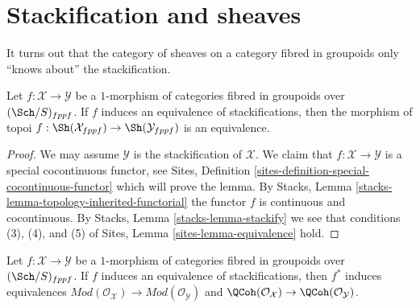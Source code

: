 \section{Stackification and sheaves}
\label{section-stackification}

\noindent
It turns out that the category of sheaves on a category fibred in
groupoids only ``knows about'' the stackification.

\begin{lemma}
\label{lemma-stackification}
Let $f : \mathcal{X} \to \mathcal{Y}$ be a $1$-morphism of categories
fibred in groupoids over $(\Sch/S)_{fppf}$. If
$f$ induces an equivalence of stackifications, then the morphism
of topoi
$f : \Sh(\mathcal{X}_{fppf}) \to \Sh(\mathcal{Y}_{fppf})$
is an equivalence.
\end{lemma}

\begin{proof}
We may assume $\mathcal{Y}$ is the stackification of $\mathcal{X}$.
We claim that $f : \mathcal{X} \to \mathcal{Y}$ is a special cocontinuous
functor, see
Sites, Definition \ref{sites-definition-special-cocontinuous-functor}
which will prove the lemma. By
Stacks, Lemma \ref{stacks-lemma-topology-inherited-functorial}
the functor $f$ is continuous and cocontinuous. By
Stacks, Lemma \ref{stacks-lemma-stackify}
we see that conditions (3), (4), and (5) of
Sites, Lemma \ref{sites-lemma-equivalence}
hold.
\end{proof}

\begin{lemma}
\label{lemma-stackification-quasi-coherent}
Let $f : \mathcal{X} \to \mathcal{Y}$ be a $1$-morphism of categories
fibred in groupoids over $(\Sch/S)_{fppf}$. If
$f$ induces an equivalence of stackifications, then $f^*$
induces equivalences
$\textit{Mod}(\mathcal{O}_\mathcal{X}) \to
\textit{Mod}(\mathcal{O}_\mathcal{Y})$
and
$\QCoh(\mathcal{O}_\mathcal{X}) \to
\QCoh(\mathcal{O}_\mathcal{Y})$.
\end{lemma}

